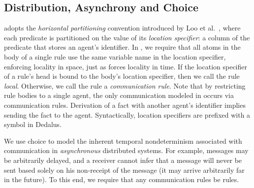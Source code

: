    





\subsection{Distribution, Asynchrony and Choice}

\lang adopts the {\em horizontal partitioning} convention introduced by Loo et
al.~\cite{Loo:2005}, where each predicate is partitioned on the value of its
{\em location specifier}: a column of the predicate that stores an agent's
identifier.  In \lang, we require that all atoms in the body of a single rule
use the same variable name in the location specifier, enforcing locality in
space, just as \lang forces locality in time.  If the location specifier of a
rule's head is bound to the body's location specifier, then we call the rule
{\em local}.  Otherwise, we call the rule a {\em communication rule}.  Note
that by restricting rule bodies to a single agent, the only communication
modeled in \lang occurs via communication rules.  Derivation of a fact with
another agent's identifier implies sending the fact to the agent.
Syntactically, location specifiers are prefixed with a \dedalus{\#} symbol in
Dedalus.

We use choice to model the inherent temporal nondeterminism associated with
communication in {\em asynchronous} distributed systems.  For example, messages
may be arbitrarily delayed, and a receiver cannot infer that a message will
never be sent based solely on his non-receipt of the message (it may arrive
arbitrarily far in the future).  To this end, we require that any communication
rules be  rules.  

